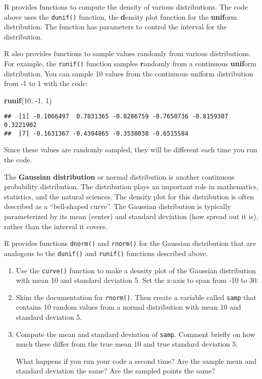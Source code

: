 \documentclass[
]{article}
\newenvironment{Shaded}{\begin{snugshade}}{\end{snugshade}}
\newcommand{\DecValTok}[1]{\textcolor[rgb]{0.00,0.00,0.81}{#1}}
\newcommand{\KeywordTok}[1]{\textcolor[rgb]{0.13,0.29,0.53}{\textbf{#1}}}
\newcommand{\NormalTok}[1]{#1}
\begin{document}
R provides functions to compute the density of various distributions.
The code above uses the \texttt{dunif()} function, the \textbf{d}ensity
plot function for the \textbf{unif}orm distribution. The function has
parameters to control the interval for the distribution.

R also provides functions to sample values randomly from various
distributions. For example, the \texttt{runif()} function samples
\textbf{r}andomly from a continuous \textbf{unif}orm distribution. You
can sample 10 values from the continuous uniform distribution from -1 to
1 with the code:

\begin{Shaded}
\begin{Highlighting}[]
\KeywordTok{runif}\NormalTok{(}\DecValTok{10}\NormalTok{, }\DecValTok{{-}1}\NormalTok{, }\DecValTok{1}\NormalTok{)}
\end{Highlighting}
\end{Shaded}

\begin{verbatim}
##  [1] -0.1066497  0.7831365 -0.8286759 -0.7650736 -0.8159307  0.3221902
##  [7] -0.1631367 -0.4394865 -0.3538038 -0.6515584
\end{verbatim}

Since these values are randomly sampled, they will be different each
time you run the code.

The \textbf{Gaussian distribution} or normal distribution is another
continuous probability distribution. The distribution plays an important
role in mathematics, statistics, and the natural sciences. The density
plot for this distribution is often described as a ``bell-shaped
curve''. The Gaussian distribution is typically parameterized by its
mean (center) and standard deviation (how spread out it is), rather than
the interval it covers.

R provides functions \texttt{dnorm()} and \texttt{rnorm()} for the
Gaussian distribution that are analogous to the \texttt{dunif()} and
\texttt{runif()} functions described above.

\begin{enumerate}
\def\labelenumi{\arabic{enumi}.}
\item
  Use the \texttt{curve()} function to make a density plot of the
  Gaussian distribution with mean 10 and standard deviation 5. Set the
  x-axis to span from -10 to 30.
\item
  Skim the documentation for \texttt{rnorm()}. Then create a variable
  called \texttt{samp} that contains 10 random values from a normal
  distribution with mean 10 and standard deviation 5.
\item
  Compute the mean and standard deviation of \texttt{samp}. Comment
  briefly on how much these differ from the true mean 10 and true
  standard deviation 5.

  What happens if you run your code a second time? Are the sample mean
  and standard deviation the same? Are the sampled points the same?
\end{enumerate}
\end{document}
